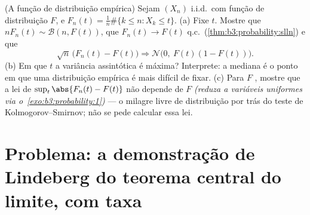 \begin{exercise}[$\star\star$]\label{exo:b3:clt:12}
(A função de distribuição empírica) Sejam $(X_n)$ i.i.d.\ com função
de distribuição $F$, e $F_n(t) =
\frac1n\#\{k \leq n : X_k \leq t\}$.
(a) Fixe $t$. Mostre que $n F_n(t) \sim \mathcal B(n, F(t))$, que $F_n(t) \to F(t)$ q.c.\ (\cref{thm:b3:probability:slln}) e
que
\[
\sqrt n\,\bigl(F_n(t) - F(t)\bigr) \Longrightarrow
\mathcal N\bigl(0,\ F(t)(1 - F(t))\bigr) .
\]
(b) Em que $t$ a variância assintótica é máxima? Interprete: a
mediana é o ponto em que uma distribuição empírica é mais difícil de
fixar.
(c) Para $F$ , mostre que a lei de $\sup_t\abs{F_n(t) - F(t)}$ não depende de
$F$ \emph{(reduza a variáveis uniformes via o~\cref{exo:b3:probability:1})} --- o
milagre livre de distribuição por trás do teste de
Kolmogorov--Smirnov; não se pede calcular essa lei.
\end{exercise}

\section{Problema: a demonstração de Lindeberg do teorema central do
limite, com taxa}

